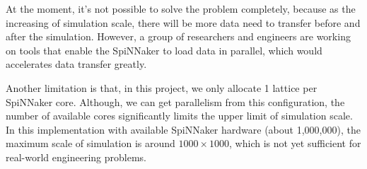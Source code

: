 At the moment, it's not possible to solve the problem completely, because as the increasing of simulation scale, there will be more data need to transfer before and after the simulation. However, a group of researchers and engineers are working on tools that enable the SpiNNaker to load data in parallel, which would accelerates data transfer greatly.

Another limitation is that, in this project, we only allocate 1 lattice per SpiNNaker core. Although, we can get parallelism from this configuration, the number of available cores significantly limits the upper limit of simulation scale. In this implementation with available SpiNNaker hardware (about 1,000,000), the maximum scale of simulation is around  $1000 \times 1000$, which is not yet sufficient for real-world engineering problems.